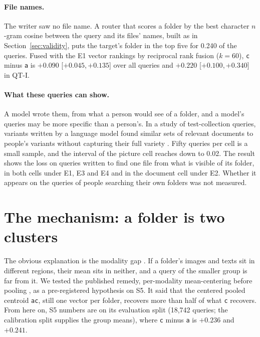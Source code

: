 \documentclass[11pt]{article}
\newcommand{\rep}[1]{\texttt{#1}}
\newcommand{\ci}[2]{[\ensuremath{#1},\,\ensuremath{#2}]}  %
\begin{document}
\paragraph{File names.} The writer saw no file name. A router that scores a folder by the best character $n$-gram cosine between the query and its files' names, built as in Section~\ref{sec:validity}, puts the target's folder in the top five for 0.240 of the queries. Fused with the E1 vector rankings by reciprocal rank fusion ($k = 60$), \rep{c} minus \rep{a} is $+0.090$ \ci{+0.045}{+0.135} over all queries and $+0.220$ \ci{+0.100}{+0.340} in QT-I.

\paragraph{What these queries can show.} A model wrote them, from what a person would see of a folder, and a model's queries may be more specific than a person's. In a study of test-collection queries, variants written by a language model found similar sets of relevant documents to people's variants without capturing their full variety \citep{alaofi2023variants}. Fifty queries per cell is a small sample, and the interval of the picture cell reaches down to 0.02. The result shows the loss on queries written to find one file from what is visible of its folder, in both cells under E1, E3 and E4 and in the document cell under E2. Whether it appears on the queries of people searching their own folders was not measured.

\section{The mechanism: a folder is two clusters}
\label{sec:mechanism}

The obvious explanation is the modality gap \citep{liang2022mindgap}. If a folder's images and texts sit in different regions, their mean sits in neither, and a query of the smaller group is far from it. We tested the published remedy, per-modality mean-centering before pooling \citep{li2025grclip}, as a pre-registered hypothesis on S5. It said that the centered pooled centroid \rep{ac}, still one vector per folder, recovers more than half of what \rep{c} recovers. From here on, S5 numbers are on its evaluation split (18,742 queries; the calibration split supplies the group means), where \rep{c} minus \rep{a} is $+0.236$ and $+0.241$.
\end{document}
